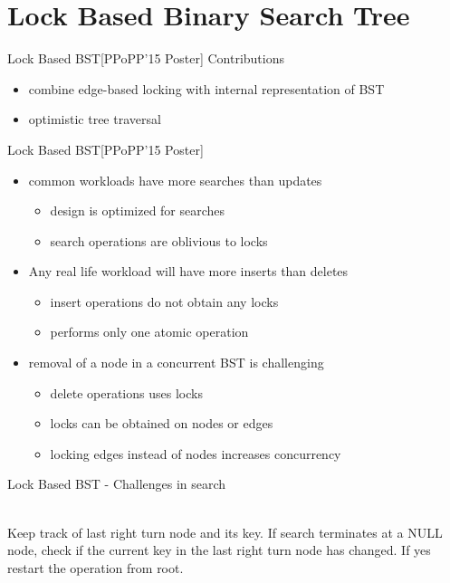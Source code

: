 \documentclass{beamer}
\begin{document}
\section{Lock Based Binary Search Tree}
\begin{frame}[c]{Lock Based BST[PPoPP'15 Poster]}
Contributions
\begin{itemize}
\item combine edge-based locking with internal representation of BST
\item optimistic tree traversal 
\end{itemize}
\end{frame}

\begin{frame}[c]{Lock Based BST[PPoPP'15 Poster]}
\begin{itemize}
\item common workloads have more searches than updates
\begin{itemize}
\item design is optimized for searches
\item search operations are oblivious to locks
\end{itemize}
\pause
\item Any real life workload will have more inserts than deletes
\begin{itemize}
\item insert operations do not obtain any locks
\item performs only one atomic operation
\end{itemize}
\pause
\item removal of a node in a concurrent BST is challenging
\begin{itemize}
\item delete operations uses locks
\item locks can be obtained on nodes or edges
\item locking edges instead of nodes increases concurrency
\end{itemize}
\end{itemize}
\end{frame}

\begin{frame}{Lock Based BST - Challenges in search}

{
\\Keep track of last right turn node and its key. If search terminates at a NULL node, check if the current key in the last right turn node has changed. If yes restart the operation from root.
}
\end{frame}
\end{document}
